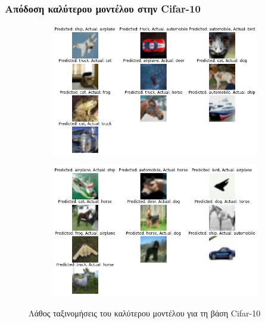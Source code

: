 \documentclass{beamer}
\begin{document}
\begin{frame}
\frametitle{Απόδοση καλύτερου μοντέλου στην Cifar-10}

\begin{figure}[H]
    \centering

    \begin{subfigure}[t]{0.48\linewidth}
    \includegraphics[width=\linewidth]{figures/cifar/wrong_results_1.png}
    \end{subfigure}
    \begin{subfigure}[t]{0.48\linewidth}
    \includegraphics[width=\linewidth]{figures/cifar/wrong_results_2.png}
    \end{subfigure}

    \caption{Λάθος ταξινομήσεις του καλύτερου μοντέλου για τη βάση Cifar-10}
    \label{fig:cifar_wrong}
\end{figure}

\end{frame}
\end{document}
